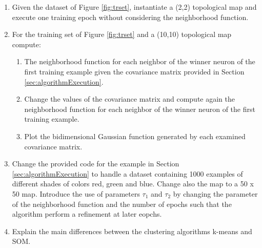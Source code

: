 \begin{enumerate}
    \item Given the dataset of Figure \ref{fig:trset}, instantiate a (2,2) topological map and execute one training epoch without considering the neighborhood function.
    \item For the training set of Figure \ref{fig:trset} and a (10,10) topological map compute:
    \begin{enumerate}
        \item The neighborhood function for each neighbor of the winner neuron of the first training example given the covariance matrix provided in Section \ref{sec:algorithmExecution}. 
        \item Change the values of the covariance matrix and compute again the neighborhood function for each neighbor of the winner neuron of the first training example.
        \item Plot the bidimensional Gaussian function generated by each examined covariance matrix. 
    \end{enumerate}
    \item Change the provided code for the example in Section \ref{sec:algorithmExecution} to handle a dataset containing 1000 examples of different shades of colors red, green and blue. Change also the map to a 50 x 50 map. Introduce the use of parameters $\tau_1$ and $\tau_2$ by changing the parameter of the neighborhood function and the number of epochs such that the algorithm perform a refinement at later eopchs. 
    \item Explain the main differences between the clustering algorithms k-means and SOM.
    
\end{enumerate}





